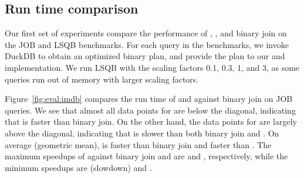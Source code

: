 

\subsection{Run time comparison}\label{sec:run-time-comparison}
Our first set of experiments compare the performance of \FJ, \GJ, and binary join
on the JOB and LSQB benchmarks.
For each query in the benchmarks, we invoke DuckDB to obtain an optimized binary plan,
and provide the plan to our \FJ and \GJ implementation.
We run LSQB with the scaling factors 0.1, 0.3, 1, and 3,
as some queries run out of memory with larger scaling factors.

Figure~\ref{fig:eval:imdb} compares the run time of \FJ and \GJ against binary join on JOB queries.
We see that almost all data points for \FJ are below the diagonal,
indicating that \FJ is faster than binary join.
On the other hand, the data points for \GJ are largely above the diagonal,
indicating that \GJ is slower than both binary join and \FJ.
On average (geometric mean), \FJ is \imdbavgfjbj faster than binary join
and \imdbavgfjgj faster than \GJ.
The maximum speedups of \FJ against binary join and \GJ
are \imdbmaxfjbj and \imdbmaxfjgj, respectively,
while the minimum speedups are \imdbminfjbj (\imdbmaxbjfj slowdown) and \imdbminfjgj.

